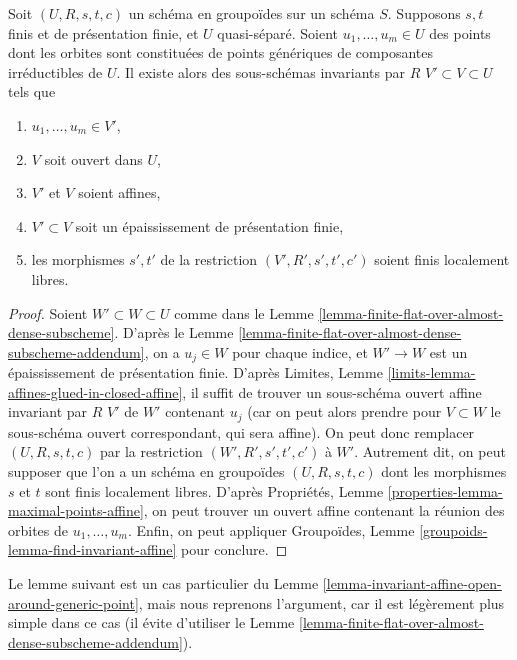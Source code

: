\begin{lemma}
\label{lemma-invariant-affine-open-around-generic-point}
Soit $(U, R, s, t, c)$ un schéma en groupoïdes sur un schéma $S$. Supposons $s, t$
finis et de présentation finie, et $U$ quasi-séparé. Soient
$u_1, \ldots, u_m \in U$ des points dont les orbites sont constituées de points génériques
de composantes irréductibles de $U$. Il existe alors des sous-schémas invariants par $R$
$V' \subset V \subset U$ tels que
\begin{enumerate}
\item $u_1, \ldots, u_m \in V'$,
\item $V$ soit ouvert dans $U$,
\item $V'$ et $V$ soient affines,
\item $V' \subset V$ soit un épaississement de présentation finie,
\item les morphismes $s', t'$ de la restriction $(V', R', s', t', c')$
soient finis localement libres.
\end{enumerate}
\end{lemma}

\begin{proof}
Soient $W' \subset W \subset U$ comme dans le
Lemme \ref{lemma-finite-flat-over-almost-dense-subscheme}.
D'après le Lemme \ref{lemma-finite-flat-over-almost-dense-subscheme-addendum},
on a $u_j \in W$ pour chaque indice, et $W' \to W$ est un épaississement de présentation finie.
D'après Limites, Lemme \ref{limits-lemma-affines-glued-in-closed-affine},
il suffit de trouver un sous-schéma ouvert affine invariant par $R$
$V'$ de $W'$ contenant $u_j$ (car on peut alors prendre pour $V \subset W$
le sous-schéma ouvert correspondant, qui sera affine).
On peut donc remplacer $(U, R, s, t, c)$ par la restriction
$(W', R', s', t', c')$ à $W'$.
Autrement dit, on peut supposer que l'on a un schéma en groupoïdes $(U, R, s, t, c)$
dont les morphismes $s$ et $t$ sont finis localement libres.
D'après Propriétés, Lemme \ref{properties-lemma-maximal-points-affine},
on peut trouver un ouvert affine contenant la réunion des orbites de
$u_1, \ldots, u_m$. Enfin, on peut appliquer
Groupoïdes, Lemme \ref{groupoids-lemma-find-invariant-affine}
pour conclure.
\end{proof}

\noindent
Le lemme suivant est un cas particulier du
Lemme \ref{lemma-invariant-affine-open-around-generic-point},
mais nous reprenons l'argument, car il est légèrement plus simple dans ce cas
(il évite d'utiliser le
Lemme \ref{lemma-finite-flat-over-almost-dense-subscheme-addendum}).

